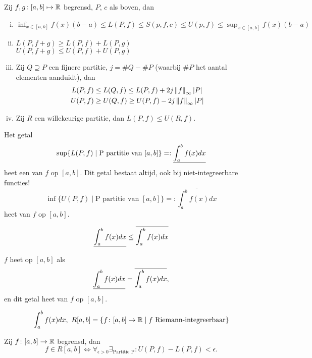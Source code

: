 \documentclass{2wa40summary}
\begin{document}
			\begin{lemma}
				Zij $ f,g\colon [a,b] \mapsto \mathbb{R} $ begrensd, $P$, $c$ als boven, dan
				\begin{enumerate}[(i)]
					\item $\displaystyle \inf_{x\in [a,b]} f(x) (b-a) \le L(P,f) \le S(p,f,c) \le U(p,f) \le \sup_{x \in [a,b]} f(x) (b-a) $
					\item $L(P,f+g) \ge L(P,f) + L(P,g)$ \\
					$U(P,f+g) \le U(P,f) + U(P,g)$
					\item Zij $Q \supseteq P$ een fijnere partitie, $ j = \#Q -\#P $ (waarbij $\#P$ het aantal elementen aanduidt), dan 
					\[ 
						\begin{split}
							L(P,f) &\le L(Q,f) \le L(P,f) + 2j \left\|f\right\|_\infty {\left|P\right|} \\
							U(P,f) &\ge U(Q,f) \ge U(P,f) - 2j \left\|f\right\|_\infty {\left|P\right|}
						\end{split}
					 \]
					 \item Zij $R$ een willekeurige partitie, dan $ L(P,f) \le U(R,f). $
				\end{enumerate}
			\end{lemma}
			\begin{define}
				 Het getal \[ \sup \{ L(P,f) \mid \text{P partitie van }[a,b] \} =: \underline{\int_{a}^{b} f(x) dx} \]
				 heet een  van $f$ op $[a,b]$.
				 \opm Dit getal bestaat altijd, ook bij niet-integreerbare functies!
				 \[ 
					 \inf \{ U(P,f) \mid \text{P partitie van }[a,b] \} =: \overline{\int_{a}^{b} f(x) dx}
				  \]
				  heet  van $f$ op $[a,b]$.
			\end{define}
			\begin{gevolg}
				\[ \underline{\int_{a}^{b} f(x) dx} \le \overline{\int_{a}^{b} f(x) dx} \]
			\end{gevolg}
			\begin{define}
				$f$ heet  op $[a,b]$ als 
				\[ \underline{\int_{a}^{b} f(x) dx} = \overline{\int_{a}^{b} f(x) dx}, \]
				en dit getal heet  van $f$ op $[a,b]$.
				\begin{nota}
					\[
					\int_{a}^{b} f(x) dx,\ R[a,b] = \{ f\colon [a,b]\to \mathbb{R} \mid f \text{ Riemann-integreerbaar} \}
					\]
				\end{nota}
			\end{define}
			
			\begin{theorem}
				Zij $ f\colon [a,b] \to \mathbb{R} $ begrensd, dan
				\[ 
					f \in R[a,b] \iff \forall_{\epsilon >0} \exists_{\text{Partitie P}}: U(P,f) - L(P,f) < \epsilon.
				 \]
			\end{theorem}
			
\end{document}
